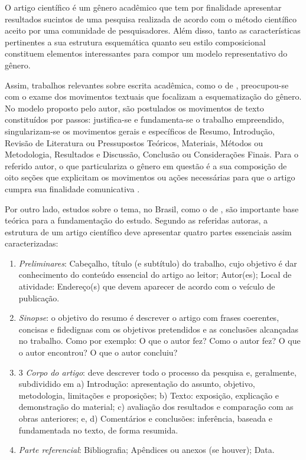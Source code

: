 \documentclass[portuguese]{textolivre}
\begin{document}
O artigo científico é um gênero acadêmico que tem por finalidade apresentar resultados sucintos de uma pesquisa realizada de acordo com o método científico aceito por uma comunidade de pesquisadores. Além disso, tanto as características pertinentes a sua estrutura esquemática quanto seu estilo composicional constituem elementos interessantes para compor um modelo representativo do gênero.

Assim, trabalhos relevantes sobre escrita acadêmica, como o de \textcite{swales_genre_1990}, preocupou-se com o exame dos movimentos textuais que focalizam a esquematização do gênero. No modelo proposto pelo autor, são postulados os movimentos de texto constituídos por passos: justifica-se e fundamenta-se o trabalho empreendido, singularizam-se os movimentos gerais e específicos de Resumo, Introdução, Revisão de Literatura ou Pressupostos Teóricos, Materiais, Métodos ou Metodologia, Resultados e Discussão, Conclusão ou Considerações Finais. Para o referido autor, o que particulariza o gênero em questão é a sua composição de oito seções que explicitam os movimentos ou ações necessárias para que o artigo cumpra sua finalidade comunicativa \cite{swales_genre_1990}.

Por outro lado, estudos sobre o tema, no Brasil, como o de \textcite{marconi_fundamentos_2010}, são importante base teórica para a fundamentação do estudo. Segundo as referidas autoras, a estrutura de um artigo científico deve apresentar quatro partes essenciais assim caracterizadas:

\begin{enumerate}
    \item \textit{Preliminares}: Cabeçalho, título (e subtítulo) do trabalho, cujo objetivo é dar conhecimento do conteúdo essencial do artigo ao leitor; Autor(es); Local de atividade: Endereço(s) que devem aparecer de acordo com o veículo de publicação.
    \item \textit{Sinopse}: o objetivo do resumo é descrever o artigo com frases coerentes, concisas e fidedignas com os objetivos pretendidos e as conclusões alcançadas no trabalho. Como por exemplo: O que o autor fez? Como o autor fez? O que o autor encontrou? O que o autor concluiu?
    \item 3 \textit{Corpo do artigo}: deve descrever todo o processo da pesquisa e, geralmente, subdividido em a) Introdução: apresentação do assunto, objetivo, metodologia, limitações e proposições; b) Texto: exposição, explicação e demonstração do material; c) avaliação dos resultados e comparação com as obras anteriores; e, d) Comentários e conclusões: inferência, baseada e fundamentada no texto, de forma resumida.
    \item \textit{Parte referencial}: Bibliografia; Apêndices ou anexos (se houver); Data.
\end{enumerate}
\end{document}
